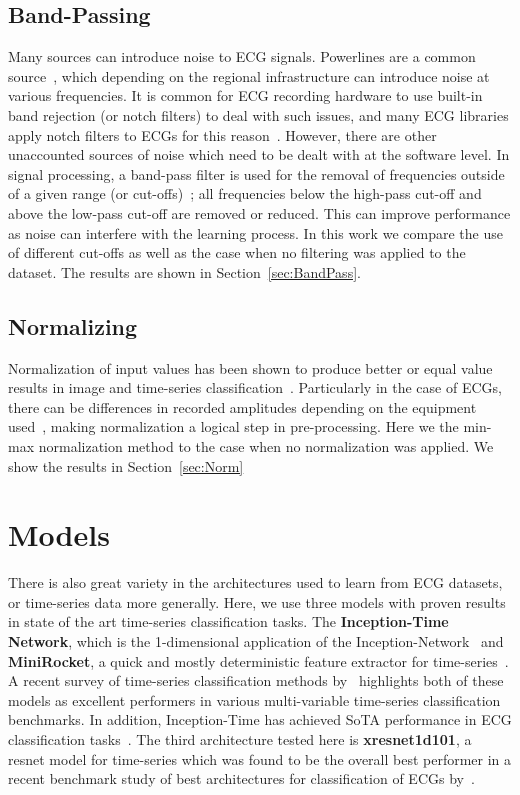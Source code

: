\documentclass[pmlr,twocolumn]{jmlr}%
\begin{document}
\subsection{Band-Passing}
Many sources can introduce noise to ECG signals. Powerlines are a common source~\citep{uwaechia2021comprehensive}, which depending on the regional infrastructure can introduce noise at various frequencies. It is common for ECG recording hardware to use built-in band rejection (or notch filters) to deal with such issues, and many ECG libraries apply notch filters to ECGs for this reason~\citep{Makowski2021neurokit}. However, there are other unaccounted sources of noise which need to be dealt with at the software level. In signal processing, a band-pass filter is used for the removal of frequencies outside of a given range (or cut-offs)~\citep{lyons1997understanding}; all frequencies below the high-pass cut-off and above the low-pass cut-off are removed or reduced. This can improve performance as noise can interfere with the learning process. In this work we compare the use of different cut-offs as well as the case when no filtering was applied to the dataset. The results are shown in Section~\ref{sec:BandPass}. 

\subsection{Normalizing}
Normalization of input values has been shown to produce better or equal value results in image and time-series classification~\citep{bhanja2018impact}. Particularly in the case of ECGs, there can be differences in recorded amplitudes depending on the equipment used~\citep{uwaechia2021comprehensive}, making normalization a logical step in pre-processing. Here we the min-max normalization method to the case when no normalization was applied. We show the results in Section~\ref{sec:Norm}

\section{Models}
There is also great variety in the architectures used to learn from ECG datasets, or time-series data more generally. Here, we use three models with proven results in state of the art time-series classification tasks. The \textbf{Inception-Time Network}, which is the 1-dimensional application of the Inception-Network~\citep{szegedy2017inception,ismail2020inceptiontime} and \textbf{MiniRocket}, a quick and mostly deterministic feature extractor for time-series~\citep{dempster2021minirocket}. A recent survey of time-series classification methods by~\cite{ruiz2021great} highlights both of these models as excellent performers in various multi-variable time-series classification benchmarks. In addition, Inception-Time has achieved SoTA performance in ECG classification tasks~\citep{Strodthoff2021}. The third architecture tested here is \textbf{xresnet1d101}, a resnet model for time-series which was found to be the overall best performer in a recent benchmark study of best architectures for classification of ECGs by~\citet{strodthoff2020deep}.
\end{document}
